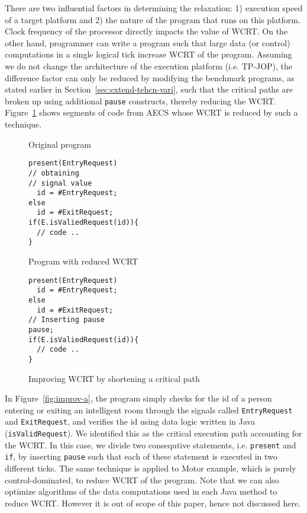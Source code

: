 There are two influential factors in determining the relaxation: 1)
execution speed of a target platform and 2) the nature of the program
that runs on this platform. Clock frequency of the processor directly
impacts the value of WCRT. On the other hand, programmer can write a
program such that large data (or control) computations in a single
logical tick increase WCRT of the program.  Assuming we do not change
the architecture of the execution platform (i.e. TP-JOP), the difference
factor can only be reduced by modifying the benchmark programs, as
stated earlier in Section~\ref{sec:extend-tehcn-vari}, such that the
critical paths are broken up using additional \texttt{pause} constructs,
thereby reducing the WCRT. Figure~\ref{fig:improv} shows segments of
code from AECS whose WCRT is reduced by such a technique.

\begin{figure}[h!]
	\centering
	\vspace{-10pt}
	\begin{SubFloat}{\label{fig:improv-a}Original program}
    \begin{minipage}[b]{0.45\linewidth}
		\begin{lstlisting}[style=sysj,morekeywords={present,emit,trap,pause,exit,delay,suspend}]
present(EntryRequest)
// obtaining 
// signal value
  id = #EntryRequest;
else
  id = #ExitRequest;
if(E.isValiedRequest(id)){
  // code ..
}
\end{lstlisting}
\end{minipage}
\end{SubFloat}
  \begin{SubFloat}{\label{fig:improv-b}Program with reduced WCRT}
    \centering
    \begin{minipage}[b]{0.45\linewidth}
		\begin{lstlisting}[style=sysj,morekeywords={emit,present,trap,pause,exit,delay,suspend}]
present(EntryRequest)
  id = #EntryRequest;
else
  id = #ExitRequest;
// Inserting pause
pause; 
if(E.isValiedRequest(id)){
  // code ..
}
\end{lstlisting}
		\end{minipage}
	\end{SubFloat}
	\caption{Improving WCRT by shortening a critical path}
	\label{fig:improv}
	\vspace{-10pt}
\end{figure}

In Figure~\ref{fig:improv-a}, the program simply checks for the id of a
person entering or exiting an intelligent room through the signals
called \texttt{EntryRequest} and \texttt{Exit\-Request}, and verifies
the id using data logic written in Java (\texttt{isValidRequest}). We
identified this as the critical execution path accounting for the WCRT.
In this case, we divide two consequtive statements, i.e.
\texttt{present} and \texttt{if}, by inserting \texttt{pause} such that
each of these statement is executed in two different ticks. The same
technique is applied to Motor example, which is purely
control-dominated, to reduce WCRT of the program. Note that we can also
optimize algorithms of the data computations used in each Java method to
reduce WCRT. However it is out of scope of this paper, hence not
discussed here.

